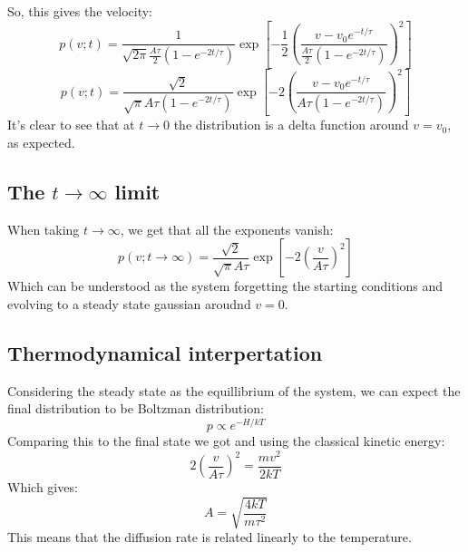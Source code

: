 \documentclass{article}
\begin{document}
So, this gives the velocity:
\begin{equation}
    p(v; t) = \frac{1}{\sqrt{2\pi}\frac{A \tau}{2} \left(1 - e^{-2t/\tau}\right)}\exp[-\frac{1}{2}\left(\frac{v - v_0 e^{-t/\tau}}{\frac{A \tau}{2} \left(1 - e^{-2t/\tau}\right)}\right)^2]
\end{equation}
\begin{equation}
    \boxed{p(v; t) = \frac{\sqrt{2}}{\sqrt{\pi}A \tau\left(1 - e^{-2t/\tau}\right)}\exp[-2\left(\frac{v - v_0 e^{-t/\tau}}{A \tau \left(1 - e^{-2t/\tau}\right)}\right)^2]}
\end{equation}
It's clear to see that at $t \rightarrow 0$ the distribution is a delta function around $v = v_0$, as expected.
\subsection{The $t \rightarrow \infty$ limit}
When taking $t \rightarrow \infty$, we get that all the exponents vanish:
\begin{equation}
    p(v; t \rightarrow \infty) = \frac{\sqrt{2}}{\sqrt{\pi}A \tau}\exp[-2\left(\frac{v}{A \tau}\right)^2]
\end{equation}
Which can be understood as the system forgetting the starting conditions and evolving to a steady state gaussian aroudnd $v = 0$.
\subsection{Thermodynamical interpertation}
Considering the steady state as the equillibrium of the system, we can expect the final distribution to be Boltzman distribution:
\begin{equation}
    p \propto e^{-H/kT}
\end{equation}
Comparing this to the final state we got and using the classical kinetic energy:
\begin{equation}
    2\left(\frac{v}{A \tau}\right)^2 = \frac{mv^2}{2kT}
\end{equation}
Which gives:
\begin{equation}
    \boxed{A = \sqrt{\frac{4kT}{m\tau^2} }}
\end{equation}
This means that the diffusion rate is related linearly to the temperature.
\end{document}
